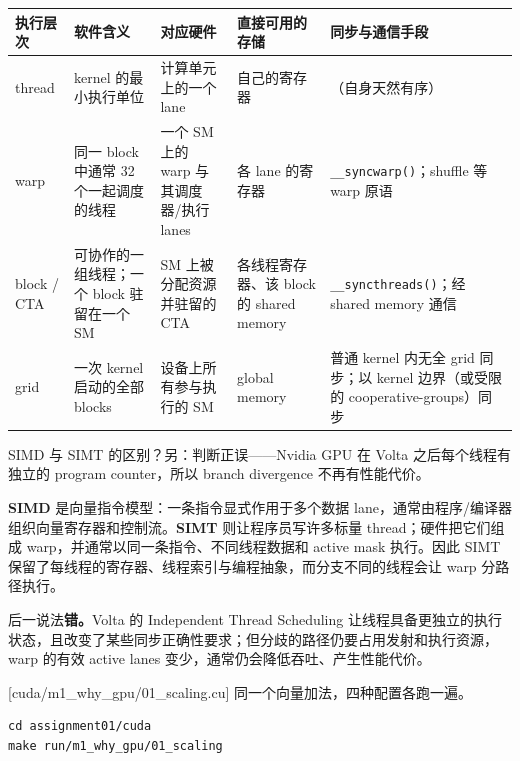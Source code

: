 \documentclass[11pt,a4paper,fontset=none]{ctexart}
\begin{document}
\begin{answer}
\begin{center}\small
\begin{tabular}{@{}p{5.2em}p{9em}p{7.5em}p{7.5em}p{8em}@{}}
\toprule
执行层次 & 软件含义 & 对应硬件 & 直接可用的存储 & 同步与通信手段 \\
\midrule
thread & kernel 的最小执行单位 & 计算单元上的一个 lane & 自己的寄存器 & （自身天然有序） \\
warp & 同一 block 中通常 32 个一起调度的线程 & 一个 SM 上的 warp 与其调度器/执行 lanes & 各 lane 的寄存器 & \texttt{\_\_syncwarp()}；shuffle 等 warp 原语 \\
block / CTA & 可协作的一组线程；一个 block 驻留在一个 SM & SM 上被分配资源并驻留的 CTA & 各线程寄存器、该 block 的 shared memory & \texttt{\_\_syncthreads()}；经 shared memory 通信 \\
grid & 一次 kernel 启动的全部 blocks & 设备上所有参与执行的 SM & global memory & 普通 kernel 内无全 grid 同步；以 kernel 边界（或受限的 cooperative-groups）同步 \\
\bottomrule
\end{tabular}
\end{center}
\end{answer}

SIMD 与 SIMT 的区别？另：判断正误——Nvidia GPU 在 Volta 之后每个线程有独立的 program counter，所以 branch divergence 不再有性能代价。

\begin{answer}
\textbf{SIMD} 是向量指令模型：一条指令显式作用于多个数据 lane，通常由程序/编译器组织向量寄存器和控制流。\textbf{SIMT} 则让程序员写许多标量 thread；硬件把它们组成 warp，并通常以同一条指令、不同线程数据和 active mask 执行。因此 SIMT 保留了每线程的寄存器、线程索引与编程抽象，而分支不同的线程会让 warp 分路径执行。

后一说法\textbf{错。}Volta 的 Independent Thread Scheduling 让线程具备更独立的执行状态，且改变了某些同步正确性要求；但分歧的路径仍要占用发射和执行资源，warp 的有效 active lanes 变少，通常仍会降低吞吐、产生性能代价。
\end{answer}

[cuda/m1\_why\_gpu/01\_scaling.cu]
同一个向量加法，四种配置各跑一遍。

\begin{lstlisting}
cd assignment01/cuda
make run/m1_why_gpu/01_scaling
\end{lstlisting}
\end{document}
